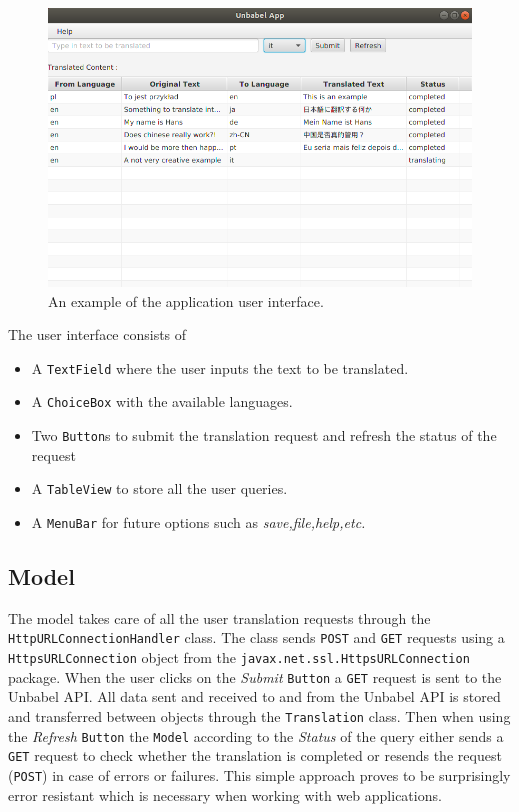 \documentclass[12pt]{article}
\begin{document}
\begin{figure}
\includegraphics[scale=0.5]{appExample.png}
\caption{An example of the application user interface.}
\label{fig:app}
\end{figure}
The user interface consists of 
\begin{itemize}
\item A \texttt{TextField} where the user inputs the text to be translated.
\item A \texttt{ChoiceBox} with the available languages. 
\item Two \texttt{Button}s to submit the translation request and refresh the status of the request
\item A \texttt{TableView} to store all the user queries.
\item A \texttt{MenuBar} for future options such as \textit{save,file,help,etc.}
\end{itemize}

\subsection{Model}
The model takes care of all the user translation requests through the \texttt{HttpURLConnectionHandler} class. The class sends \texttt{POST} and \texttt{GET} requests using a \texttt{HttpsURLConnection} object from the \texttt{javax.net.ssl.HttpsURLConnection} package. When the user clicks on the \textit{Submit} \texttt{Button} a \texttt{GET} request is sent to the Unbabel API. All data sent and received to and from the Unbabel API is stored and transferred between objects through the \texttt{Translation} class. Then when using the \textit{Refresh} \texttt{Button} the \texttt{Model} according to the \textit{Status} of the query either sends a \texttt{GET} request to check whether the translation is completed or resends the request (\texttt{POST}) in case of errors or failures. This simple approach proves to be surprisingly error resistant which is necessary when working with web applications.
\end{document}
